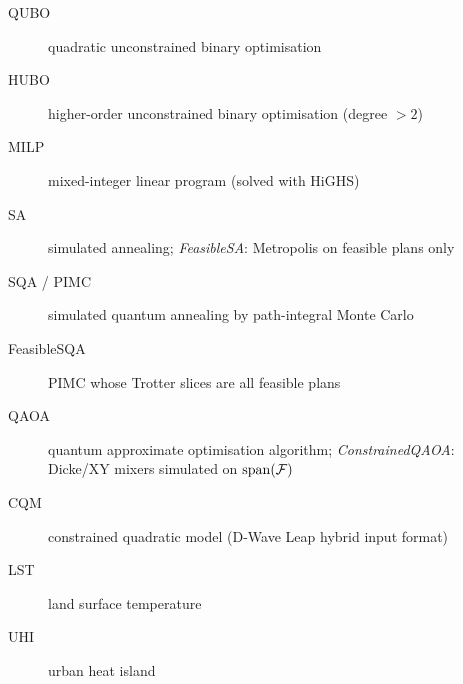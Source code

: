 \begin{description}
\item[QUBO] quadratic unconstrained binary optimisation
\item[HUBO] higher-order unconstrained binary optimisation (degree $>2$)
\item[MILP] mixed-integer linear program (solved with HiGHS)
\item[SA] simulated annealing; \emph{FeasibleSA}: Metropolis on feasible plans only
\item[SQA / PIMC] simulated quantum annealing by path-integral Monte Carlo
\item[FeasibleSQA] PIMC whose Trotter slices are all feasible plans
\item[QAOA] quantum approximate optimisation algorithm; \emph{ConstrainedQAOA}: Dicke/XY mixers simulated on $\mathrm{span}(\mathcal{F})$
\item[CQM] constrained quadratic model (D-Wave Leap hybrid input format)
\item[LST] land surface temperature
\item[UHI] urban heat island
\end{description}
